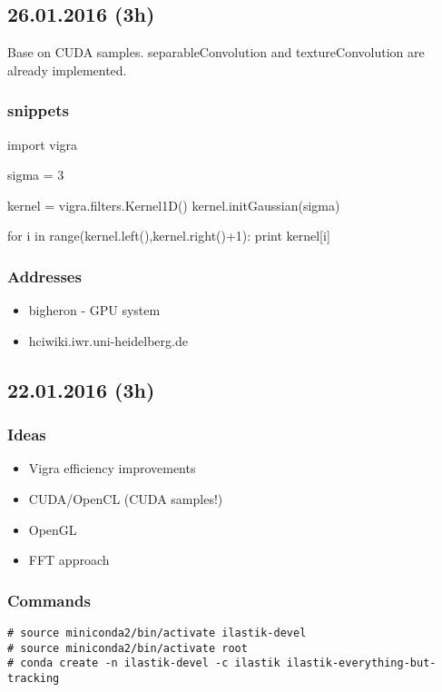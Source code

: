 \documentclass[12pt,a4paper]{article}
\begin{document}
\subsection{26.01.2016 (3h)}

  Base on CUDA samples. separableConvolution and textureConvolution are already implemented.

  \subsubsection{snippets}
    \begin{python}[caption="print out gaussian 1D kernel"]
import vigra

sigma = 3

kernel = vigra.filters.Kernel1D()
kernel.initGaussian(sigma)

for i in range(kernel.left(),kernel.right()+1):
  print kernel[i]
    \end{python}

  \subsubsection{Addresses}
    \begin{itemize}
      \item bigheron - GPU system
      \item hciwiki.iwr.uni-heidelberg.de
    \end{itemize}


\subsection{22.01.2016 (3h)}

  \subsubsection{Ideas}
    \begin{itemize}
      \item Vigra efficiency improvements
      \item CUDA/OpenCL (CUDA samples!)
      \item OpenGL
      \item FFT approach
    \end{itemize}

  \subsubsection{Commands}

    \begin{lstlisting}[style=BashInputStyle]
# source miniconda2/bin/activate ilastik-devel
# source miniconda2/bin/activate root
# conda create -n ilastik-devel -c ilastik ilastik-everything-but-tracking
    \end{lstlisting}
\end{document}
